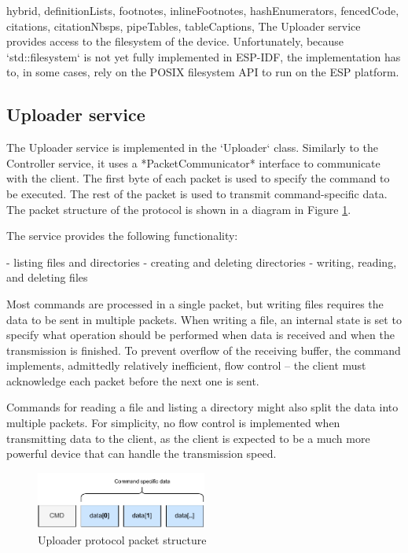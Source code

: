 \begin{markdown*}{%
  hybrid,
  definitionLists,
  footnotes,
  inlineFootnotes,
  hashEnumerators,
  fencedCode,
  citations,
  citationNbsps,
  pipeTables,
  tableCaptions,
}
The Uploader service provides access to the filesystem of the device. Unfortunately, because `std::filesystem` is not yet fully implemented in ESP-IDF, the implementation has to, in some cases, rely on the POSIX filesystem API to run on the ESP platform.

\subsection{Uploader service}

The Uploader service is implemented in the `Uploader` class. Similarly to the Controller service, it uses a *PacketCommunicator* interface to communicate with the client. The first byte of each packet is used to specify the command to be executed. The rest of the packet is used to transmit command-specific data. The packet structure of the protocol is shown in a diagram in Figure \ref{fig:uploader-protocol}.

The service provides the following functionality:

  - listing files and directories
  - creating and deleting directories
  - writing, reading, and deleting files

Most commands are processed in a single packet, but writing files requires the data to be sent in multiple packets. When writing a file, an internal state is set to specify what operation should be performed when data is received and when the transmission is finished. To prevent overflow of the receiving buffer, the command implements, admittedly relatively inefficient, flow control -- the client must acknowledge each packet before the next one is sent.

Commands for reading a file and listing a directory might also split the data into multiple packets. For simplicity, no flow control is implemented when transmitting data to the client, as the client is expected to be a much more powerful device that can handle the transmission speed.

\begin{figure}[!ht]
    \centering
    \includegraphics[width=0.5\textwidth]{img/controller-packet}
    \caption{Uploader protocol packet structure}
    \label{fig:uploader-protocol}
\end{figure}



\end{markdown*}
